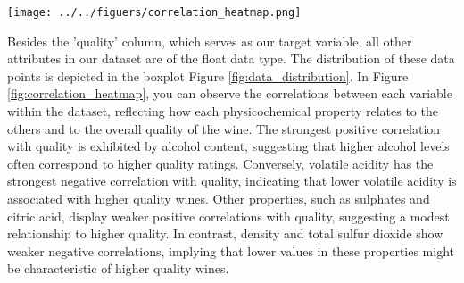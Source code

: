 \documentclass[
	letterpaper, %
	12pt, %
	unnumberedsections, %
	twoside, %
]{LTJournalArticle}
\begin{document}
\begin{figure*}[h!]
	\texttt{[image: ../../figuers/correlation\_heatmap.png]}
	\caption{correlation heatmap of wine quality dataset attributes.}
	\label{fig:correlation_heatmap}
\end{figure*}

Besides the 'quality' column, which serves as our target variable, all other attributes in our dataset are of the float data type. The distribution of these data points is depicted in the boxplot Figure \ref{fig:data_distribution}. In Figure \ref{fig:correlation_heatmap}, you can observe the correlations between each variable within the dataset, reflecting how each physicochemical property relates to the others and to the overall quality of the wine. The strongest positive correlation with quality is exhibited by alcohol content, suggesting that higher alcohol levels often correspond to higher quality ratings. Conversely, volatile acidity has the strongest negative correlation with quality, indicating that lower volatile acidity is associated with higher quality wines. Other properties, such as sulphates and citric acid, display weaker positive correlations with quality, suggesting a modest relationship to higher quality. In contrast, density and total sulfur dioxide show weaker negative correlations, implying that lower values in these properties might be characteristic of higher quality wines.
\end{document}
